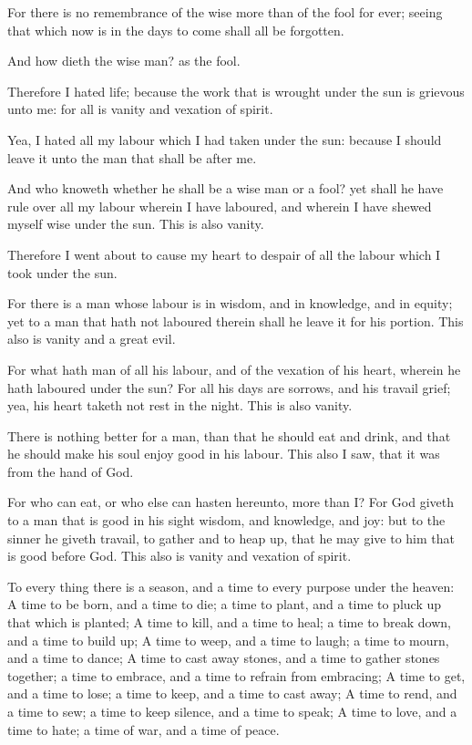 \Verse For there is no remembrance of the wise more than of the fool for ever; seeing that which now is in the days to come shall all be forgotten.

And how dieth the wise man? as the fool.

\Verse Therefore I hated life; because the work that is wrought under the sun is grievous unto me: for all is vanity and vexation of spirit.

\Verse Yea, I hated all my labour which I had taken under the sun: because I should leave it unto the man that shall be after me.

\Verse And who knoweth whether he shall be a wise man or a fool? yet shall he have rule over all my labour wherein I have laboured, and wherein I have shewed myself wise under the sun. This is also vanity.

\Verse Therefore I went about to cause my heart to despair of all the labour which I took under the sun.

\Verse For there is a man whose labour is in wisdom, and in knowledge, and in equity; yet to a man that hath not laboured therein shall he leave it for his portion. This also is vanity and a great evil.

\Verse For what hath man of all his labour, and of the vexation of his heart, wherein he hath laboured under the sun?  \Verse For all his days are sorrows, and his travail grief; yea, his heart taketh not rest in the night. This is also vanity.

\Verse There is nothing better for a man, than that he should eat and drink, and that he should make his soul enjoy good in his labour. This also I saw, that it was from the hand of God.

\Verse For who can eat, or who else can hasten hereunto, more than I?  \Verse For God giveth to a man that is good in his sight wisdom, and knowledge, and joy: but to the sinner he giveth travail, to gather and to heap up, that he may give to him that is good before God. This also is vanity and vexation of spirit.


\Chapter
\Verse To every thing there is a season, and a time to every purpose under the heaven: \Verse A time to be born, and a time to die; a time to plant, and a time to pluck up that which is planted; \Verse A time to kill, and a time to heal; a time to break down, and a time to build up; \Verse A time to weep, and a time to laugh; a time to mourn, and a time to dance; \Verse A time to cast away stones, and a time to gather stones together; a time to embrace, and a time to refrain from embracing; \Verse A time to get, and a time to lose; a time to keep, and a time to cast away; \Verse A time to rend, and a time to sew; a time to keep silence, and a time to speak; \Verse A time to love, and a time to hate; a time of war, and a time of peace.

